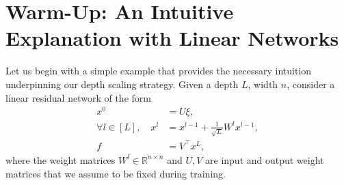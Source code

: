 \section{Warm-Up: An Intuitive Explanation with Linear Networks}\label{sec:intuition}

Let us begin with a simple example that provides the necessary intuition underpinning our depth scaling strategy. Given a depth $L$, width $n$, consider a linear residual network of the form
\begin{align*}
    x^0 & = U \xi, \\
    \forall l\in [L], \quad x^l & = x^{l - 1} + \frac1{\sqrt L} W^{l} x^{l-1},  \\
    f &= V^\top x^L,
\end{align*}
where the weight matrices $W^l \in \mathbb{R}^{n\times n}$ and $U, V$ are input and output weight matrices that we assume to be fixed during training. 

